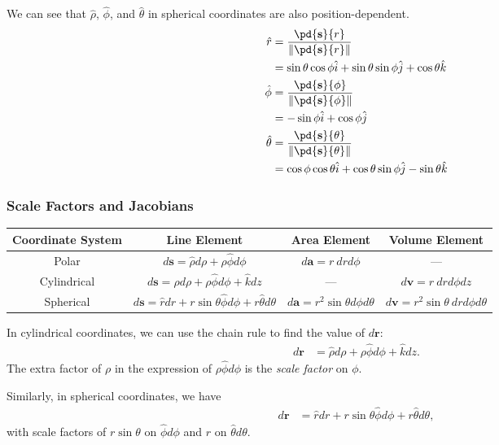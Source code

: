 \documentclass[10pt]{mypackage}
\begin{document}
We can see that $\hat\rho$, $\hat\phi$, and $\hat\theta$ in spherical coordinates are also position-dependent.
\begin{align*}
  \hat r &= \frac{\pd{\mathbf{s}}{r}}{\norm{\pd{\mathbf{s}}{r}}}\\
         &= \sin\theta\cos\phi\hat{i} + \sin\theta\sin\phi\hat{j} + \cos\theta\hat{k}\\
  \hat{\phi} &= \frac{\pd{\mathbf{s}}{\phi}}{\norm{\pd{\mathbf{s}}{\phi}}}\\
             &= -\sin\phi\hat{i} + \cos\phi\hat{j}\\
  \hat{\theta} &= \frac{\pd{\mathbf{s}}{\theta}}{\norm{\pd{\mathbf{s}}{\theta}}}\\
               &= \cos\phi\cos\theta\hat{i} + \cos\theta\sin\phi\hat{j} - \sin\theta\hat{k}
\end{align*}
\subsubsection{Scale Factors and Jacobians}%
\begin{center}
  \renewcommand{\arraystretch}{1.5}
  \begin{tabular}{c|c|c|c}
    Coordinate System & Line Element & Area Element & Volume Element\\
    \hline
    Polar & $d \mathbf{s} = \hat\rho d\rho + \rho \hat\phi d\phi$ & $d\mathbf{a} = r\:drd\phi$ & ---\\
    Cylindrical & $d \mathbf{s} = \hat\rho d\rho + \rho\hat\phi d\phi + \hat k dz$ & --- & $d \mathbf{v} = r\:dr d\phi dz$\\
    Spherical & $d \mathbf{s} = \hat r dr + r\sin\theta \hat\phi d\phi + r\hat\theta d\theta$ &  $d \mathbf{a} = r^2\sin\theta d\phi d\theta$ & $d \mathbf{v} = r^2\sin\theta\:dr d\phi d\theta$
  \end{tabular}
\end{center}
In cylindrical coordinates, we can use the chain rule to find the value of $d \mathbf{r}$:
\begin{align*}
  d \mathbf{r} &= \hat{\rho}d\rho + \rho\hat\phi d\phi + \hat k dz.
\end{align*}
The extra factor of $\rho$ in the expression of $\rho\hat\phi d\phi$ is the \textit{scale factor} on $\phi$.\newline

Similarly, in spherical coordinates, we have
\begin{align*}
  d \mathbf{r} &= \hat{r} dr +  r\sin\theta \hat{\phi}d\phi + r\hat{\theta}d\theta,
\end{align*}
with scale factors of $r\sin\theta$ on $\hat\phi d\phi$ and $r$ on $\hat\theta d\theta$.\newline
\end{document}
